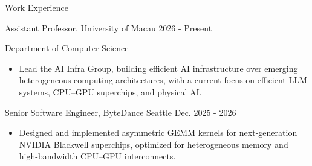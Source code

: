 \documentclass{resume} %
\begin{document}

\begin{rSection}{Work Experience}


\begin{rSubsection}{Assistant Professor, University of Macau} {2026 - Present} {}{}
\item[]
Department of Computer Science
\begin{itemize}
 \item Lead the AI Infra Group, building efficient AI infrastructure over emerging heterogeneous computing architectures, with a current focus on efficient LLM systems, CPU–GPU superchips, and physical AI.
\end{itemize}
\end{rSubsection}
\vspace{-0.5em}

\begin{rSubsection}{Senior Software Engineer, ByteDance Seattle} {Dec. 2025 - 2026} {}{}
\item[]
\begin{itemize}
 \item Designed and implemented asymmetric GEMM kernels for next-generation NVIDIA Blackwell superchips, optimized for heterogeneous memory and high-bandwidth CPU–GPU interconnects.
\end{itemize}
\end{rSubsection}
\vspace{-0.5em}


\end{rSection}
\end{document}

